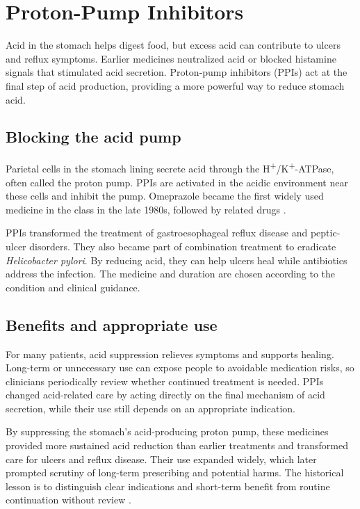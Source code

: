 \documentclass[12pt,oneside]{book}
\begin{document}
\chapter[Proton-Pump Inhibitors]{Proton-Pump Inhibitors}

Acid in the stomach helps digest food, but excess acid can contribute to
ulcers and reflux symptoms. Earlier medicines neutralized acid or blocked
histamine signals that stimulated acid secretion. Proton-pump inhibitors
(PPIs) act at the final step of acid production, providing a more powerful
way to reduce stomach acid.

\section{Blocking the acid pump}
Parietal cells in the stomach lining secrete acid through the H\textsuperscript{+}/K\textsuperscript{+}-ATPase,
often called the proton pump. PPIs are activated in the acidic environment
near these cells and inhibit the pump. Omeprazole became the first widely
used medicine in the class in the late 1980s, followed by related drugs
\cite{ppiHistory}.

PPIs transformed the treatment of gastroesophageal reflux disease and
peptic-ulcer disorders. They also became part of combination treatment to
eradicate \emph{Helicobacter pylori}. By reducing acid, they can help ulcers
heal while antibiotics address the infection. The medicine and duration are
chosen according to the condition and clinical guidance.

\section{Benefits and appropriate use}
For many patients, acid suppression relieves symptoms and supports healing.
Long-term or unnecessary use can expose people to avoidable medication risks,
so clinicians periodically review whether continued treatment is needed.
PPIs changed acid-related care by acting directly on the final mechanism of
acid secretion, while their use still depends on an appropriate indication.

By suppressing the stomach’s acid-producing proton pump, these medicines
provided more sustained acid reduction than earlier treatments and transformed
care for ulcers and reflux disease. Their use expanded widely, which later
prompted scrutiny of long-term prescribing and potential harms. The historical
lesson is to distinguish clear indications and short-term benefit from routine
continuation without review \cite{ppiHistory}.
\end{document}
